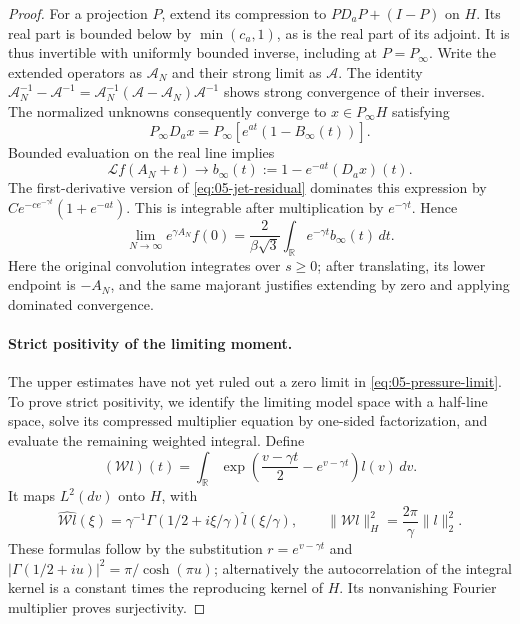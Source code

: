 \begin{proof}
For a projection \(P\), extend its compression to
\(P D_aP+(I-P)\) on \(H\). Its real part is bounded below by \(\min(c_a,1)\), as is the real part of its adjoint. It is thus invertible with uniformly bounded inverse, including at \(P=P_\infty\). Write the extended operators as \(\mathcal A_N\) and their strong limit as \(\mathcal A\). The identity
\(\mathcal A_N^{-1}-\mathcal A^{-1}=\mathcal A_N^{-1}(\mathcal A-\mathcal A_N)\mathcal A^{-1}\)
shows strong convergence of their inverses. The normalized unknowns consequently converge to \(x\in P_\infty H\) satisfying
\begin{equation}
 P_\infty D_ax=P_\infty[e^{at}(1-B_\infty(t))].
 \label{eq:05-limit-interpolation}
\end{equation}
Bounded evaluation on the real line implies
\[
 \mathscr Lf(A_N+t)\longrightarrow
 b_\infty(t):=1-e^{-at}(D_ax)(t).
\]
The first-derivative version of \eqref{eq:05-jet-residual} dominates this expression by
\(C e^{-c e^{-\gamma t}}(1+e^{-at})\).
This is integrable after multiplication by \(e^{-\gamma t}\). Hence
\begin{equation}
 \lim_{N\to\infty}e^{\gamma A_N}f(0)
 =\frac{2}{\beta\sqrt3}
     \int_{\mathbb R}e^{-\gamma t}b_\infty(t)\,dt.
 \label{eq:05-pressure-limit}
\end{equation}
Here the original convolution integrates over \(s\ge0\); after translating, its lower endpoint is \(-A_N\), and the same majorant justifies extending by zero and applying dominated convergence.

\paragraph{Strict positivity of the limiting moment.}
The upper estimates have not yet ruled out a zero limit in
\eqref{eq:05-pressure-limit}. To prove strict positivity, we identify the
limiting model space with a half-line space, solve its compressed
multiplier equation by one-sided factorization, and evaluate the
remaining weighted integral. Define
\begin{equation}
 (\mathcal W l)(t)=\int_{\mathbb R}
       \exp\!\left(\frac{v-\gamma t}{2}-e^{v-\gamma t}\right)l(v)\,dv.
 \label{eq:05-laplace-transform}
\end{equation}
It maps \(L^2(dv)\) onto \(H\), with
\[
 \widehat{\mathcal Wl}(\xi)
   =\gamma^{-1}\Gamma(1/2+i\xi/\gamma)
                    \widehat l(\xi/\gamma),
 \qquad
 \|\mathcal Wl\|_H^2=\frac{2\pi}{\gamma}\|l\|_2^2.
\]
These formulas follow by the substitution \(r=e^{v-\gamma t}\) and
\(|\Gamma(1/2+iu)|^2=\pi/\cosh(\pi u)\); alternatively the autocorrelation of the integral kernel is a constant times the reproducing kernel of \(H\). Its nonvanishing Fourier multiplier proves surjectivity.


\end{proof}
